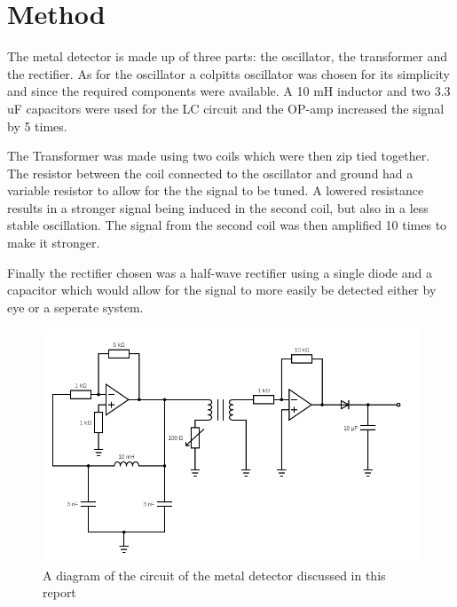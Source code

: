 \section{Method}
% 
The metal detector is made up of three parts: the oscillator, the transformer and the rectifier.
As for the oscillator a colpitts oscillator was chosen for its simplicity and since the required components were available. 
A 10 mH inductor and two 3.3 uF capacitors were used for the LC circuit and the OP-amp increased the signal by 5 times.

The Transformer was made using two coils which were then zip tied together. The resistor between the coil connected to the oscillator 
and ground had a variable resistor to allow for the the signal to be tuned. A lowered resistance results in a stronger signal
 being induced in the second coil, but also in a less stable oscillation. The signal from the second coil was then amplified 10 times to make
 it stronger.

Finally the rectifier chosen was a  half-wave rectifier using a single diode and a capacitor which would allow for the signal to more 
easily be detected either by eye or a seperate system.

\begin{figure}[h]
    \centering
    \includegraphics[scale=0.60]{circuit.png}
    \caption{A diagram of the circuit of the metal detector discussed in this report}
    \label{fig:rnn_basic}
\end{figure}